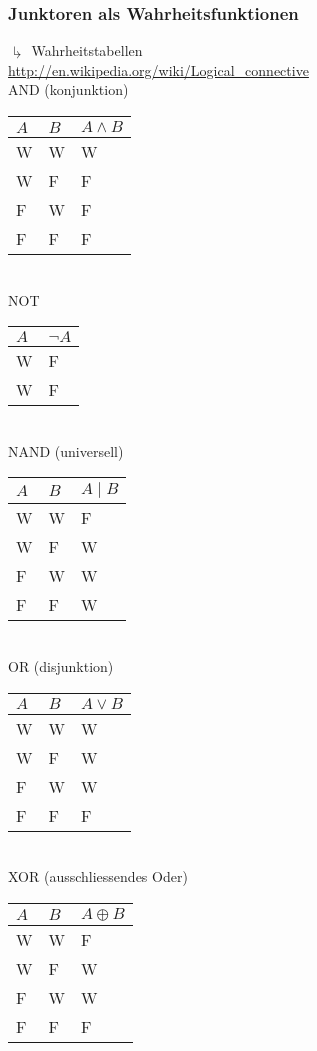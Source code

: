 \subsubsection{Junktoren als Wahrheitsfunktionen}
\qquad $\drsh$ Wahrheitstabellen \\
\url{http://en.wikipedia.org/wiki/Logical_connective} \\
AND (konjunktion) \\
\begin{tabular}{ | l | l | l | }
	\hline
	$A$	& $B$	& $A \wedge B$	\\ \hline
	W	& W		& W			\\ \hline
	W	& F		& F			\\ \hline
	F	& W		& F			\\ \hline
	F	& F		& F			\\ \hline
\end{tabular} \\
NOT \\
\begin{tabular}{ | l | l | }
	\hline
	$A$	& $\neg A$	\\ \hline
	W	& F			\\ \hline
	W	& F			\\ \hline
\end{tabular} \\
NAND (universell) \\
\begin{tabular}{ | l | l | l | }
	\hline
	$A$	& $B$	& $A \mid B$	\\ \hline
	W	& W		& F			\\ \hline
	W	& F		& W			\\ \hline
	F	& W		& W			\\ \hline
	F	& F		& W			\\ \hline
\end{tabular}\\
OR (disjunktion) \\
\begin{tabular}{ | l | l | l | }
	\hline
	$A$	& $B$	& $A \vee B$	\\ \hline
	W	& W		& W			\\ \hline
	W	& F		& W			\\ \hline
	F	& W		& W			\\ \hline
	F	& F		& F			\\ \hline
\end{tabular} \\
XOR (ausschliessendes Oder) \\
\begin{tabular}{ | l | l | l | }
	\hline
	$A$	& $B$	& $A \oplus B$	\\ \hline
	W	& W		& F			\\ \hline
	W	& F		& W			\\ \hline
	F	& W		& W			\\ \hline
	F	& F		& F			\\ \hline
\end{tabular} \\
